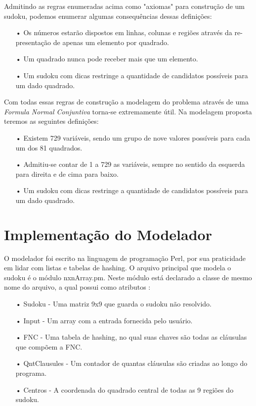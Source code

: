 \documentclass[a4paper]{article}
\begin{document}
Admitindo as regras enumeradas acima como "axiomas" para construção de um sudoku, podemos enumerar algumas consequências dessas definições:

\begin{enumerate}
\item[•]{Os números estarão dispostos em linhas, colunas e regiões através da re-presentação de apenas um elemento por quadrado.}
\item[•]{Um quadrado nunca pode receber mais que um elemento.}
\item[•]{Um sudoku com dicas restringe a quantidade de candidatos possíveis para um dado quadrado.}
\end{enumerate}

Com todas essas regras de construção a modelagem do problema através de uma \textit{Formula Normal Conjuntiva} torna-se extremamente útil. Na modelagem proposta teremos as seguintes definições:

\begin{enumerate}
\item[•]{Existem 729 variáveis, sendo um grupo de nove valores possíveis para cada um dos 81 quadrados.}
\item[•]{Admitiu-se contar de 1 a 729 as variáveis, sempre no sentido da esquerda para direita e de cima para baixo.}
\item[•]{Um sudoku com dicas restringe a quantidade de candidatos possíveis para um dado quadrado.}
\end{enumerate}

\section{Implementação do Modelador}
O modelador foi escrito na linguagem de programação Perl, por sua praticidade em lidar com listas e tabelas de hashing. O arquivo principal que modela o sudoku é o módulo nxnArray.pm. Neste módulo está declarado a classe de mesmo nome do arquivo, a qual possui como atributos :
\begin{enumerate}
\item[•]{Sudoku - Uma matriz 9x9 que guarda o sudoku não resolvido.}
\item[•]{Input - Um array com a entrada fornecida pelo usuário.}
\item[•]{FNC - Uma tabela de hashing, no qual suas chaves são todas as cláusulas que compõem a FNC.}
\item[•]{QntClausules - Um contador de quantas cláusulas são criadas ao longo do programa.}
\item[•]{Centros - A coordenada do quadrado central de todas as 9 regiões do sudoku.}
\end{enumerate}
\end{document}
